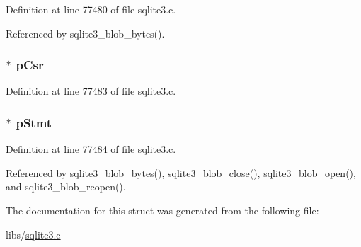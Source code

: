 Definition at line 77480 of file sqlite3.\+c.



Referenced by sqlite3\+\_\+blob\+\_\+bytes().

\hypertarget{struct_incrblob_a9e635cb5153166419ad625deb508c3b3}{}
\subsubsection[{p\+Csr}]{$\ast$ p\+Csr}\label{struct_incrblob_a9e635cb5153166419ad625deb508c3b3}


Definition at line 77483 of file sqlite3.\+c.

\hypertarget{struct_incrblob_a67d1f816562e1a4851f044e829476aed}{}
\subsubsection[{p\+Stmt}]{$\ast$ p\+Stmt}\label{struct_incrblob_a67d1f816562e1a4851f044e829476aed}


Definition at line 77484 of file sqlite3.\+c.



Referenced by sqlite3\+\_\+blob\+\_\+bytes(), sqlite3\+\_\+blob\+\_\+close(), sqlite3\+\_\+blob\+\_\+open(), and sqlite3\+\_\+blob\+\_\+reopen().



The documentation for this struct was generated from the following file\+:\begin{DoxyCompactItemize}
\item 
libs/\hyperlink{sqlite3_8c}{sqlite3.\+c}\end{DoxyCompactItemize}
